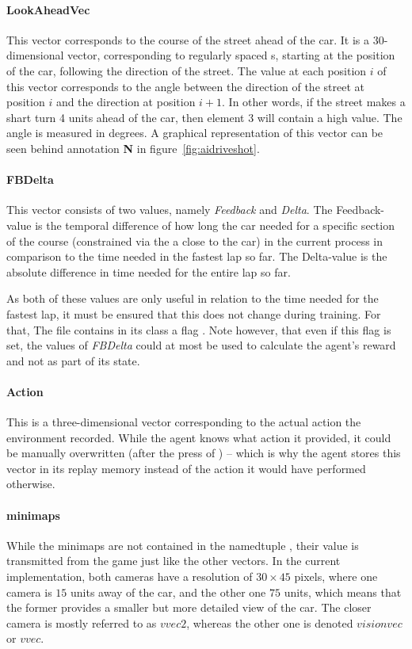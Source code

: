 \paragraph{LookAheadVec} This vector corresponds to the course of the street ahead of the car. It is a 30-dimensional vector, corresponding to regularly spaced s, starting at the position of the car, following the direction of the street. The value at each position $i$ of this vector corresponds to the angle between the direction of the street at position $i$ and the direction at position $i+1$. In other words, if the street makes a shart turn 4 units ahead of the car, then element $3$ will contain a high value. The angle is measured in degrees. A graphical representation of this vector can be seen behind annotation \textbf{N} in figure~\ref{fig:aidriveshot}.

\paragraph{FBDelta} This vector consists of two values, namely \emph{Feedback} and \emph{Delta}. The Feedback-value is the temporal difference of how long the car needed for a specific section of the course (constrained via the a  close to the car) in the current process in comparison to the time needed in the fastest lap so far. The Delta-value is the absolute difference in time needed for the entire lap so far.

As both of these values are only useful in relation to the time needed for the fastest lap, it must be ensured that this does not change during training. For that, The file  contains in its class  a flag . Note however, that even if this flag is set, the values of \emph{FBDelta} could at most be used to calculate the agent's reward and not as part of its state.

\paragraph{Action} This is a three-dimensional vector corresponding to the actual action the environment recorded. While the agent knows what action it provided, it could be manually overwritten (after the press of ) -- which is why the agent stores this vector in its replay memory instead of the action it would have performed otherwise.


\paragraph{minimaps} While the minimaps are not contained in the namedtuple , their value is transmitted from the game just like the other vectors. In the current implementation, both cameras have a resolution of $30\times45$ pixels, where one camera is $15$ units away of the car, and the other one $75$ units, which means that the former provides a smaller but more detailed view of the car. The closer camera is mostly referred to as $vvec2$, whereas the other one is denoted $visionvec$ or $vvec$.\\

